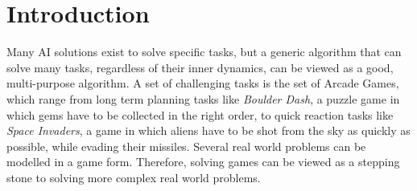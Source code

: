 \chapter{Introduction}
\label{chap:introduction}
Many AI solutions exist to solve specific tasks, but a generic algorithm
that can solve many tasks, regardless of their inner dynamics, can be viewed as
a good, multi-purpose algorithm. A set of challenging tasks is the set of Arcade
Games, which range from long term planning tasks like \emph{Boulder Dash}, a
puzzle game in which gems have to be collected in the right order, to quick
reaction tasks like \emph{Space Invaders}, a game in which aliens have to be
shot from the sky as quickly as possible, while evading their missiles. Several
real world problems can be modelled in a game form. Therefore, solving games can
be viewed as a stepping stone to solving more complex real world problems. 







